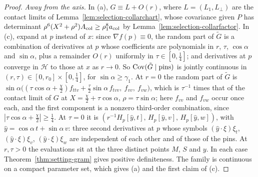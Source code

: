 \begin{proof}
\emph{Away from the axis.} In (a), $G\equiv L+O(r)$, where $L=(L_1,L_\perp)$ are the contact limits of Lemma~\ref{lem:selection-collarchart}, whose covariance given $P$ has determinant $\rho^6(X^2+\rho^2)A_{\rm col}\ge\rho_1^8a_{\rm col}$ by Lemma~\ref{lem:selection-collarfactor}. In (c), expand at $p$ instead of $x$: since $\nabla f(p)\equiv0$, the random part of $\tilde G$ is a combination of derivatives at $p$ whose coefficients are polynomials in $r$, $\tau$, $\cos\alpha$ and $\sin\alpha$, plus a remainder $O(r)$ uniformly in $\tau\in[0,\frac14]$; and derivatives at $p$ converge in $\mathcal H$ to those at $x$ as $r\to0$. So $\operatorname{Cov}(\tilde G\mid\text{pins})$ is jointly continuous in $(r,\tau)\in[0,r_0]\times[0,\frac14]$, for $\sin\alpha\ge\gamma_1$. At $r=0$ the random part of $\tilde G$ is $\sin\alpha\bigl((\tau\cos\alpha+\frac\chi2)f_{ttv}+\frac\tau2\sin\alpha\,f_{tvv},\ f_{vv},\ f_{vw}\bigr)$, which is $\tau^{-1}$ times that of the contact limit of $G$ at $X=\frac\chi2+\tau\cos\alpha$, $\rho=\tau\sin\alpha$; here $f_{vv}$ and $f_{vw}$ occur once each, and the first component is a nonzero third-order combination, since $|\tau\cos\alpha+\frac\chi2|\ge\frac14$. At $\tau=0$ it is $(r^{-1}H_p[\hat y,t],\,H_p[\hat y,v],\,H_p[\hat y,w])$, with $\hat y=\cos\alpha\,t+\sin\alpha\,v$: three second derivatives at $p$ whose symbols $(\hat y\cdot\xi)\xi_t$, $(\hat y\cdot\xi)\xi_v$, $(\hat y\cdot\xi)\xi_w$ are independent of each other and of those of the pins. At $r,\tau>0$ the evaluations sit at the three distinct points $M$, $S$ and $y$. In each case Theorem~\ref{thm:setting-gram} gives positive definiteness. The family is continuous on a compact parameter set, which gives (a) and the first claim of (c).
\end{proof}
